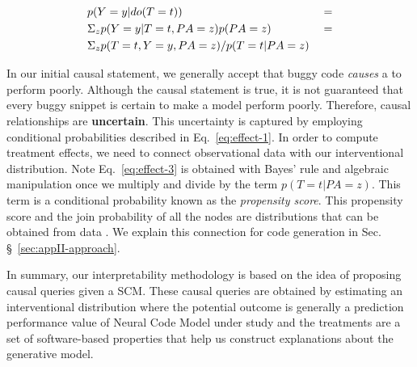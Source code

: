 \begin{subequations}
    {%
        \begin{align}
        &p(Y=y|do(T=t)) &&=  \label{eq:effect-1}\\
        &\Sigma_z p(Y=y|T=t,PA=z)p(PA=z)  &&= \label{eq:effect-2}\\
        &\Sigma_z p(T=t,Y=y,PA=z)/p(T=t|PA=z) \label{eq:effect-3}
        \end{align}
    }
\label{eq:effect}
\end{subequations}

In our initial causal statement, we generally accept that buggy code \textit{causes} a \nlm to perform poorly. Although the causal statement is true, it is not guaranteed that every buggy snippet is certain to make a model perform poorly. Therefore, causal relationships are \textbf{uncertain}. This uncertainty is captured by employing conditional probabilities described in Eq.~\ref{eq:effect-1}. In order to compute treatment effects, we need to connect observational data with our interventional distribution. Note Eq.~\ref{eq:effect-3} is obtained with Bayes' rule and algebraic manipulation once we multiply and divide by the term $p(T=t|PA=z)$. This term is a conditional probability known as the \textit{propensity score}. This propensity score and the join probability of all the nodes are distributions that can be obtained from data \citep{Pearl2016Causality}. We explain this connection for code generation in Sec. \S~\ref{sec:appII-approach}. 

In summary, our interpretability methodology \codegen is based on the idea of proposing causal queries given a SCM. These causal queries are obtained by estimating an interventional distribution where the potential outcome is generally a prediction performance value of Neural Code Model under study and the treatments are a set of software-based properties that help us construct explanations about the generative model.

